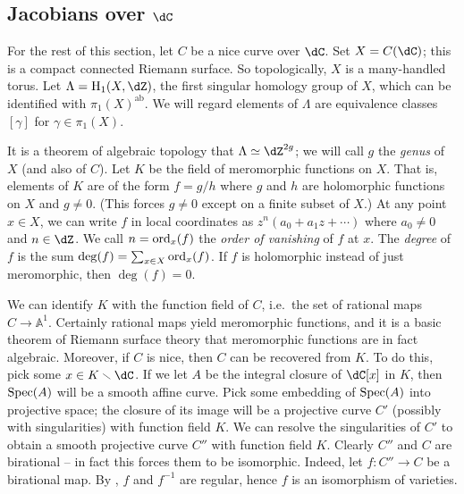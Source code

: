 \subsection{Jacobians over \texorpdfstring{$\dC$}{C}}

For the rest of this section, let $C$ be a nice curve over $\dC$. Set 
$X=C(\dC)$; this is a compact connected Riemann surface. So 
topologically, $X$ is a many-handled torus. Let $\Lambda=\h_1(X,\dZ)$, 
the first singular homology group of $X$, which can be identified with 
$\pi_1(X)^\text{ab}$. We will regard elements of $\Lambda$ are equivalence 
classes $[\gamma]$ for $\gamma\in \pi_1(X)$. 


It is a theorem of algebraic topology that $\Lambda\simeq\dZ^{2 g}$; we 
will call $g$ the \emph{genus} of $X$ (and also of $C$). Let $K$ be the field 
of meromorphic functions on $X$. That is, elements of $K$ are of the 
form $f=g/h$ where $g$ and $h$ are holomorphic functions on $X$ and $g\ne 0$. 
(This forces $g\ne 0$ except on a finite subset of $X$.) At any point 
$x\in X$, we can write $f$ in local coordinates as $z^n(a_0+a_1 z+\cdots)$ 
where $a_0\ne 0$ and $n\in\dZ$. We call $n=\operatorname{ord}_x(f)$ the \emph{order 
of vanishing} of $f$ at $x$. The \emph{degree} of $f$ is the sum 
$\deg(f)=\sum_{x\in X}\operatorname{ord}_x(f)$. If $f$ is holomorphic instead of just 
meromorphic, then $\deg(f)=0$.  
 
We can identify $K$ with the function field of $C$, i.e.\ the set of rational 
maps $C\to\mathbb{A}^1$. Certainly rational maps yield meromorphic functions, 
and it is a basic theorem of Riemann surface theory that meromorphic functions 
are in fact algebraic. Moreover, if $C$ is nice, then $C$ can be recovered 
from $K$. To do this, pick some $x\in K\smallsetminus \dC$. If we let $A$ be 
the integral closure of $\dC[x]$ in $K$, then $\operatorname{Spec}(A)$ will be a 
smooth affine curve. Pick some embedding of $\operatorname{Spec}(A)$ into projective space; 
the closure of its image will be a projective curve $C'$ (possibly with 
singularities) with function field $K$. We can resolve the singularities of 
$C'$ to obtain a smooth projective curve $C''$ with function field $K$. 
Clearly $C''$ and $C$ are birational -- in fact this forces them to be 
isomorphic. Indeed, let $f:C''\to C$ be a birational map. By 
\cite[thm 3.1]{mi-av}, $f$ and $f^{-1}$ are regular, hence $f$ is an 
isomorphism of varieties. 


